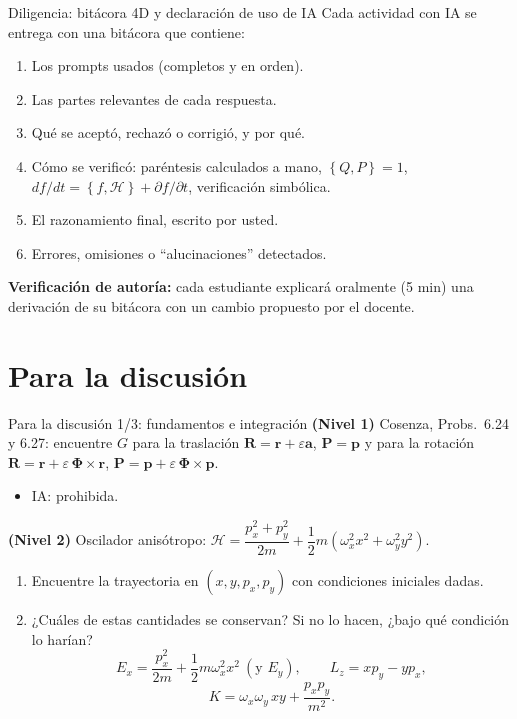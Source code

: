 \documentclass[spanish]{beamer}
\newcommand{\Ham}{\mathcal{H}}
\newcommand{\pb}[2]{\left\{#1,#2\right\}}   %
\begin{document}
\begin{frame}{Diligencia: bitácora 4D y declaración de uso de IA}
Cada actividad con IA se entrega con una bitácora que contiene:
\begin{enumerate}
  \item Los prompts usados (completos y en orden).
  \item Las partes relevantes de cada respuesta.
  \item Qué se aceptó, rechazó o corrigió, y por qué.
  \item Cómo se verificó: paréntesis calculados a mano, $\pb{Q}{P}=1$,
        $df/dt = \pb{f}{\Ham} + \partial f/\partial t$, verificación simbólica.
  \item El razonamiento final, escrito por usted.
  \item Errores, omisiones o ``alucinaciones'' detectados.
\end{enumerate}
\vspace{0.2cm}
\textbf{Verificación de autoría:} cada estudiante explicará oralmente (5 min) una
derivación de su bitácora con un cambio propuesto por el docente.
\end{frame}

\section{Para la discusión}

\begin{frame}{Para la discusión 1/3: fundamentos e integración}
\textbf{(Nivel 1)} Cosenza, Probs.~6.24 y 6.27: encuentre $G$ para la traslación
$\mathbf R = \mathbf r + \varepsilon\mathbf a$, $\mathbf P = \mathbf p$ y para la rotación
$\mathbf R = \mathbf r + \varepsilon\,\boldsymbol\Phi\times\mathbf r$,
$\mathbf P = \mathbf p + \varepsilon\,\boldsymbol\Phi\times\mathbf p$.
\begin{itemize}
  \item IA: prohibida.
\end{itemize}
\vspace{0.15cm}
\textbf{(Nivel 2)} Oscilador anisótropo:
$\Ham = \dfrac{p_x^2 + p_y^2}{2m} + \dfrac12 m\left(\omega_x^2x^2 + \omega_y^2y^2\right)$.
\begin{enumerate}
  \item Encuentre la trayectoria en $(x,y,p_x,p_y)$ con condiciones iniciales dadas.
  \item ¿Cuáles de estas cantidades se conservan? Si no lo hacen, ¿bajo qué condición
        lo harían?
  \[
    E_x = \frac{p_x^2}{2m} + \frac12 m\omega_x^2x^2 \ (\text{y } E_y), \qquad
    L_z = xp_y - yp_x,
  \]
  \[
    K = \omega_x\omega_y\,xy + \frac{p_xp_y}{m^2} .
  \]
\end{enumerate}
\end{frame}
\end{document}
